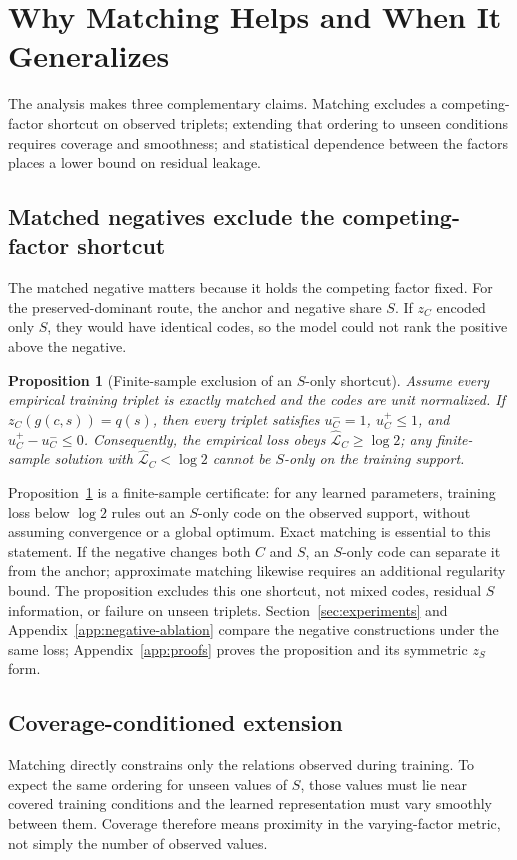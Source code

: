 \documentclass[11pt]{article}
\newtheorem{proposition}{Proposition}
\begin{document}
\section{Why Matching Helps and When It Generalizes}
\label{sec:theory}
The analysis makes three complementary claims. Matching excludes a competing-factor shortcut on observed triplets; extending that ordering to unseen conditions requires coverage and smoothness; and statistical dependence between the factors places a lower bound on residual leakage.

\subsection{Matched negatives exclude the competing-factor shortcut}
The matched negative matters because it holds the competing factor fixed. For the preserved-dominant route, the anchor and negative share $S$. If $z_C$ encoded only $S$, they would have identical codes, so the model could not rank the positive above the negative.

\begin{proposition}[Finite-sample exclusion of an $S$-only shortcut]\label{prop:shortcut}
Assume every empirical training triplet is exactly matched and the codes are unit normalized. If $z_C(g(c,s))=q(s)$, then every triplet satisfies $u_C^-=1$, $u_C^+\leq1$, and $u_C^+-u_C^-\leq0$. Consequently, the empirical loss obeys $\widehat{\mathcal{L}}_C\geq\log 2$; any finite-sample solution with $\widehat{\mathcal{L}}_C<\log 2$ cannot be $S$-only on the training support.
\end{proposition}
Proposition~\ref{prop:shortcut} is a finite-sample certificate: for any learned parameters, training loss below $\log 2$ rules out an $S$-only code on the observed support, without assuming convergence or a global optimum. Exact matching is essential to this statement. If the negative changes both $C$ and $S$, an $S$-only code can separate it from the anchor; approximate matching likewise requires an additional regularity bound. The proposition excludes this one shortcut, not mixed codes, residual $S$ information, or failure on unseen triplets. Section~\ref{sec:experiments} and Appendix~\ref{app:negative-ablation} compare the negative constructions under the same loss; Appendix~\ref{app:proofs} proves the proposition and its symmetric $z_S$ form.

\subsection{Coverage-conditioned extension}
Matching directly constrains only the relations observed during training. To expect the same ordering for unseen values of $S$, those values must lie near covered training conditions and the learned representation must vary smoothly between them. Coverage therefore means proximity in the varying-factor metric, not simply the number of observed values.
\end{document}
